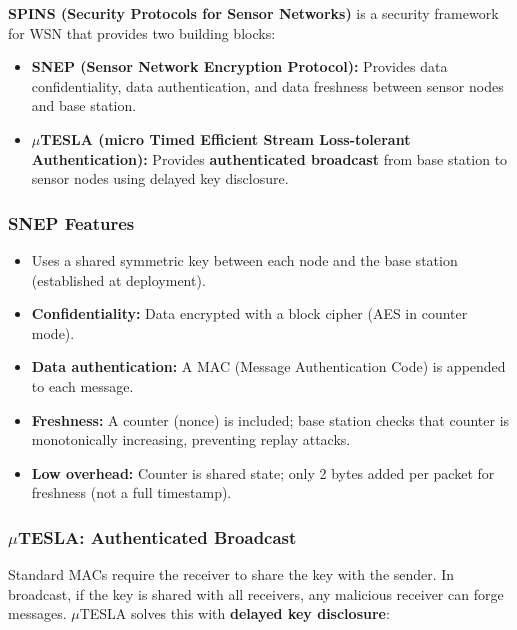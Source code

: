 \documentclass[12pt,a4paper]{article}
\begin{document}
\begin{tcolorbox}[defbox, title={\textbf{SPINS --- Definition}}]
\textbf{SPINS (Security Protocols for Sensor Networks)} is a security framework for WSN that provides two building blocks:
\begin{itemize}
  \item \textbf{SNEP (Sensor Network Encryption Protocol):} Provides data confidentiality, data authentication, and data freshness between sensor nodes and base station.
  \item \textbf{\boldmath$\mu$TESLA (micro Timed Efficient Stream Loss-tolerant Authentication):} Provides \textbf{authenticated broadcast} from base station to sensor nodes using delayed key disclosure.
\end{itemize}
\end{tcolorbox}

\subsubsection*{SNEP Features}

\begin{itemize}[leftmargin=*, itemsep=3pt]
  \item Uses a shared symmetric key between each node and the base station (established at deployment).
  \item \textbf{Confidentiality:} Data encrypted with a block cipher (AES in counter mode).
  \item \textbf{Data authentication:} A MAC (Message Authentication Code) is appended to each message.
  \item \textbf{Freshness:} A counter (nonce) is included; base station checks that counter is monotonically increasing, preventing replay attacks.
  \item \textbf{Low overhead:} Counter is shared state; only 2 bytes added per packet for freshness (not a full timestamp).
\end{itemize}

\subsubsection*{\texorpdfstring{$\mu$}{mu}TESLA: Authenticated Broadcast}

Standard MACs require the receiver to share the key with the sender. In broadcast, if the key is shared with all receivers, any malicious receiver can forge messages. $\mu$TESLA solves this with \textbf{delayed key disclosure}:
\end{document}
